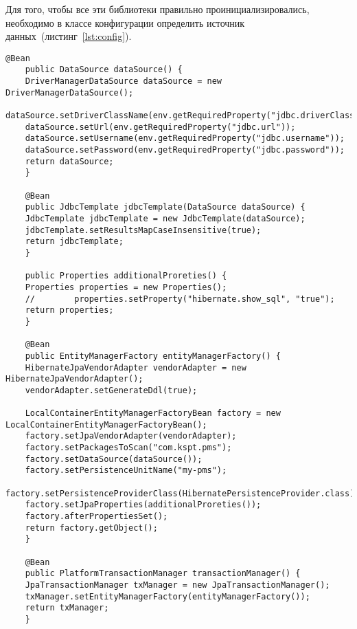 	Для того, чтобы все эти библиотеки правильно проинициализировались, необходимо в классе конфигурации определить источник данных~(листинг~\ref{lst:config}).
	\begin{lstlisting}[style=crs_java, label={lst:config}, caption={Конфигурация источника данных}]
	@Bean
	public DataSource dataSource() {
	DriverManagerDataSource dataSource = new DriverManagerDataSource();
	dataSource.setDriverClassName(env.getRequiredProperty("jdbc.driverClassName"));
	dataSource.setUrl(env.getRequiredProperty("jdbc.url"));
	dataSource.setUsername(env.getRequiredProperty("jdbc.username"));
	dataSource.setPassword(env.getRequiredProperty("jdbc.password"));
	return dataSource;
	}
	
	@Bean
	public JdbcTemplate jdbcTemplate(DataSource dataSource) {
	JdbcTemplate jdbcTemplate = new JdbcTemplate(dataSource);
	jdbcTemplate.setResultsMapCaseInsensitive(true);
	return jdbcTemplate;
	}
	
	public Properties additionalProreties() {
	Properties properties = new Properties();
	//        properties.setProperty("hibernate.show_sql", "true");
	return properties;
	}
	
	@Bean
	public EntityManagerFactory entityManagerFactory() {
	HibernateJpaVendorAdapter vendorAdapter = new HibernateJpaVendorAdapter();
	vendorAdapter.setGenerateDdl(true);
	
	LocalContainerEntityManagerFactoryBean factory = new LocalContainerEntityManagerFactoryBean();
	factory.setJpaVendorAdapter(vendorAdapter);
	factory.setPackagesToScan("com.kspt.pms");
	factory.setDataSource(dataSource());
	factory.setPersistenceUnitName("my-pms");
	factory.setPersistenceProviderClass(HibernatePersistenceProvider.class);
	factory.setJpaProperties(additionalProreties());
	factory.afterPropertiesSet();
	return factory.getObject();
	}
	
	@Bean
	public PlatformTransactionManager transactionManager() {
	JpaTransactionManager txManager = new JpaTransactionManager();
	txManager.setEntityManagerFactory(entityManagerFactory());
	return txManager;
	}
	\end{lstlisting}
	
